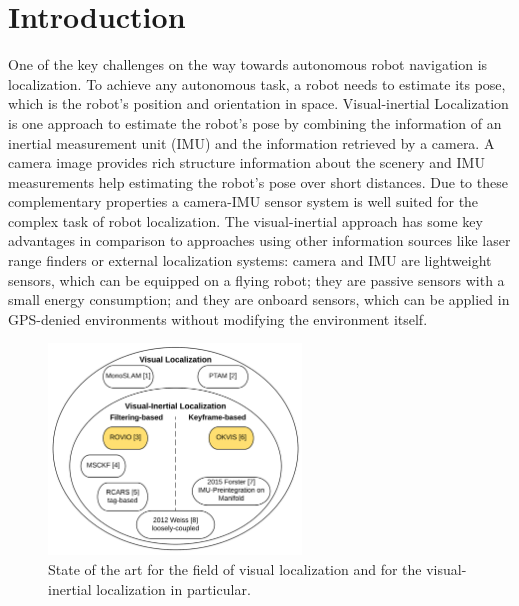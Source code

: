 \chapter{Introduction}
\label{sec:introduction}

One of the key challenges on the way towards autonomous robot navigation is localization. To achieve any autonomous task, a robot needs to estimate its pose, which is the robot's position and orientation in space. Visual-inertial Localization is one approach to estimate the robot's pose by combining the information of an inertial measurement unit (IMU) and the information retrieved by a camera. A camera image provides rich structure information about the scenery and IMU measurements help estimating the robot's pose over short distances. Due to these complementary properties a camera-IMU sensor system is well suited for the complex task of robot localization. The visual-inertial approach has some key advantages in comparison to approaches using other information sources like laser range finders or external localization systems: camera and IMU are lightweight sensors, which can be equipped on a flying robot; they are passive sensors with a small energy consumption; and they are onboard sensors, which can be applied in GPS-denied environments without modifying the environment itself. \\


\begin{figure}[h]
   \centering
   \includegraphics[width=0.6\textwidth]{images/state_of_the_art.png}
   \caption{State of the art for the field of visual localization and for the visual-inertial localization in particular.}
   \label{pics:state_of_the_art}
\end{figure}

